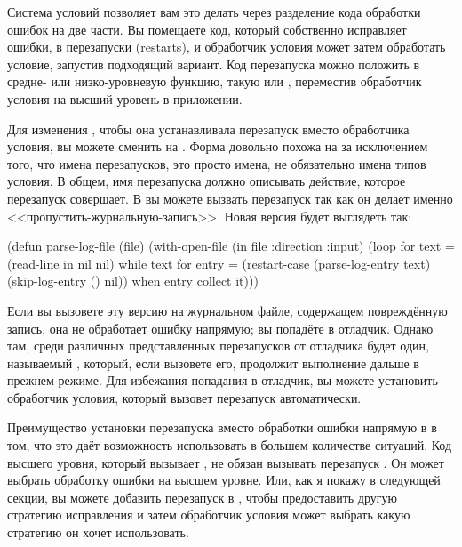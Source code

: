 Система условий позволяет вам это делать через разделение кода обработки ошибок на две
части. Вы помещаете код, который собственно исправляет ошибки, в перезапуски (restarts), и
обработчик условия может затем обработать условие, запустив подходящий вариант. Код
перезапуска можно положить в средне- или низко-уровневую функцию, такую
 или , переместив обработчик условия на высший
уровень в приложении.

Для изменения , чтобы она устанавливала перезапуск вместо обработчика
условия, вы можете сменить  на . Форма
 довольно похожа на  за исключением того, что имена
перезапусков, это просто имена, не обязательно имена типов условия. В общем, имя
перезапуска должно описывать действие, которое перезапуск совершает. В
 вы можете вызвать перезапуск  так как он делает
именно <<пропустить-журнальную-запись>>. Новая версия будет выглядеть так:

\begin{myverb}
(defun parse-log-file (file)
  (with-open-file (in file :direction :input)
    (loop for text = (read-line in nil nil) while text
       for entry = (restart-case (parse-log-entry text)
                     (skip-log-entry () nil))
       when entry collect it)))
\end{myverb}

Если вы вызовете эту версию  на журнальном файле, содержащем
повреждённую запись, она не обработает ошибку напрямую; вы попадёте в отладчик. Однако
там, среди различных представленных перезапусков от отладчика будет один, называемый
, который, если вызовете его, продолжит выполнение
 дальше в прежнем режиме. Для избежания попадания в отладчик, вы
можете установить обработчик условия, который вызовет перезапуск 
автоматически.

Преимущество установки перезапуска вместо обработки ошибки напрямую в
 в том, что это даёт возможность использовать  в
большем количестве ситуаций. Код высшего уровня, который вызывает ,
не обязан вызывать перезапуск . Он может выбрать обработку ошибки на
высшем уровне. Или, как я покажу в следующей секции, вы можете добавить перезапуск в
, чтобы предоставить другую стратегию исправления и затем обработчик
условия может выбрать какую стратегию он хочет использовать.

